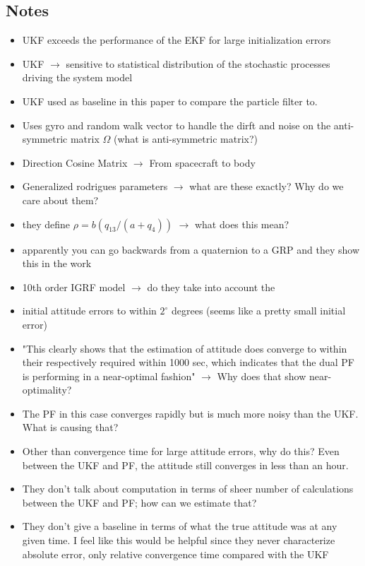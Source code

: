 \documentclass[11pt]{article}
\begin{document}
\subsection{Notes} 
\begin{itemize}[noitemsep]
    \item UKF exceeds the performance of the EKF for large initialization errors
    \item UKF $\rightarrow$ sensitive to statistical distribution of the stochastic processes driving the system model
    \item UKF used as baseline in this paper to compare the particle filter to.
    \item Uses gyro and random walk vector to handle the dirft and noise on the anti-symmetric matrix $\Omega$ (what is anti-symmetric matrix?)
    \item Direction Cosine Matrix $\rightarrow$ From spacecraft to body
    \item Generalized rodrigues parameters $\rightarrow$ what are these exactly? Why do we care about them?
    \item they define $\rho = b(q_{13}/(a + q_4))$ $\rightarrow$ what does this mean?
    \item apparently you can go backwards from a quaternion to a GRP and they show this in the work
    \item 10th order IGRF model $\rightarrow$ do they take into account the 
    \item initial attitude errors to within $2^{\circ}$ degrees (seems like a pretty small initial error)
    \item "This clearly shows that the estimation of attitude does converge to within their respectively required within 1000 sec, which indicates that the dual PF is performing in a near-optimal fashion" $\rightarrow$ Why does that show near-optimality?
    \item The PF in this case converges rapidly but is much more noisy than the UKF. What is causing that?
    \item Other than convergence time for large attitude errors, why do this? Even between the UKF and PF, the attitude still converges in less than an hour.
    \item They don't talk about computation in terms of sheer number of calculations between the UKF and PF; how can we estimate that?
    \item They don't give a baseline in terms of what the true attitude was at any given time. I feel like this would be helpful since they never characterize absolute error, only relative convergence time compared with the UKF
\end{itemize}
\end{document}
